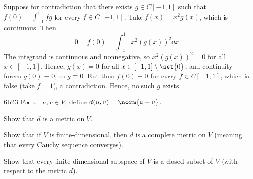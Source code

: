 \begin{sol}
    Suppose for contradiction that there exists $g \in C[-1, 1]$ such that $f(0) = \int_{-1}^{1} fg$ for every $f \in C[-1, 1]$.
    Take $f(x) = x^2 g(x)$, which is continuous.
    Then
    \[
        0 = f(0) = \int_{-1}^{1} x^2 (g(x))^2 \dd x.
    \]
    The integrand is continuous and nonnegative, so $x^2 (g(x))^2 = 0$ for all $x \in [-1, 1]$.
    Hence, $g(x) = 0$ for all $x \in [-1, 1] \setminus \set{0}$, and continuity forces $g(0) = 0$, so $g \equiv 0$.
    But then $f(0) = 0$ for every $f \in C[-1, 1]$, which is false (take $f = 1$), a contradiction.
    Hence, no such $g$ exists.
\end{sol}

\begin{exercise}{6b23}
    For all $u, v \in V$, define $d(u, v) = \norm{u - v}$.
    \begin{subexercises}
        \item Show that $d$ is a metric on $V$.
        \item Show that if $V$ is finite-dimensional, then $d$ is a complete metric on $V$ (meaning that every Cauchy sequence converges).
        \item Show that every finite-dimensional subspace of $V$ is a closed subset of $V$ (with respect to the metric $d$).
    \end{subexercises}
\end{exercise}

